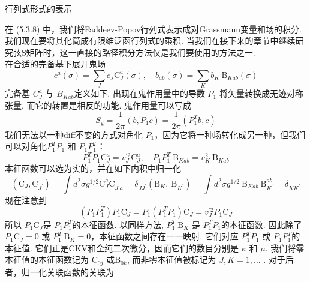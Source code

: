 \centerline{\Large 行列式形式的表示}
在 (5.3.8) 中，我们将Faddeev-Popov行列式表示成对Grassmann变量和场的积分.我们现在要将其化简成有限维泛函行列式的乘积. 当我们在接下来的章节中继续研究弦S矩阵时，这一直接的路径积分方法仅是我们要使用的方法之一.\\
在合适的完备基下展开鬼场
\begin{equation}
	c^{a}(\sigma)=\sum_{J} c_{J} \mathrm{C}_{J}^{a}(\sigma), \quad b_{a b}(\sigma)=\sum_{K} b_{K} \mathrm{~B}_{K a b}(\sigma)
\end{equation}
完备基 $C_{J}^{a}$ 与 $B_{K a b}$定义如下. 出现在鬼作用量中的导数 $P_{1}$ 将矢量转换成无迹对称张量. 而它的转置是相反的功能. 鬼作用量可以写成
\begin{equation}
	S_{\mathrm{g}}=\frac{1}{2 \pi}\left(b, P_{1} c\right)=\frac{1}{2 \pi}\left(P_{1}^{T} b, c\right)
\end{equation}
我们无法以一种diff不变的方式对角化 $P_{1}$，因为它将一种场转化成另一种，但我们可以对角化$P_{1}^{T} P_{1}$ 和 $P_{1} P_{1}^{T}$：
\begin{equation}
	P_{1}^{T} P_{1} \mathrm{C}_{J}^{a}=v_{J}^{\prime 2} \mathrm{C}_{J}^{a}, \quad P_{1} P_{1}^{T} \mathrm{~B}_{K a b}=v_{K}^{2} \mathrm{~B}_{K a b}
\end{equation}
本征函数可以选为实的，并在如下内积中归一化
\begin{subequations}
\begin{equation}
\left(\mathrm{C}_{J}, \mathrm{C}_{J^{\prime}}\right) =\int d^{2} \sigma g^{1 / 2} \mathrm{C}_{J}^{a} \mathrm{C}_{J^{\prime} a}=\delta_{J J^{\prime}} 
\end{equation}
\begin{equation}
\left(\mathrm{B}_{K}, \mathrm{~B}_{K^{\prime}}\right) =\int d^{2} \sigma g^{1 / 2} \mathrm{~B}_{K a b} \mathrm{~B}_{K^{\prime}}^{a b}=\delta_{K K^{\prime}}
\end{equation}
\end{subequations}
现在注意到
\begin{equation}
	\left(P_{1} P_{1}^{T}\right) P_{1} \mathrm{C}_{J}=P_{1}\left(P_{1}^{T} P_{1}\right) \mathrm{C}_{J}=v_{J}^{\prime 2} P_{1} \mathrm{C}_{J}
\end{equation}
所以 $P_{1} \mathrm{C}_{J}$是 $P_{1} P_{1}^{T} $的本征函数. 以同样方法, $P_{1}^{T} \mathrm{~B}_{K}$ 是 $P_{1}^{T} P_{1} $的本征函数. 因此除了 $P_{1} \mathrm{C}_{J}=0$ 或 $P_{1}^{T} \mathrm{~B}_{K}=0 $，本征函数之间存在一一映射.  它们对应 $P_{1}^{T} P_{1}$ 或 $P_{1} P_{1}^{T} $的本征值. 它们正是CKV和全纯二次微分，因而它们的数目分别是 $\kappa$ 和 $\mu$. 我们将零本征值的本征函数记为 $\mathrm{C}_{0 j}$ 或$\mathrm{B}_{0 k}$, 而非零本征值被标记为 $J, K=1, \ldots$ . 对于后者，归一化关联函数的关联为
